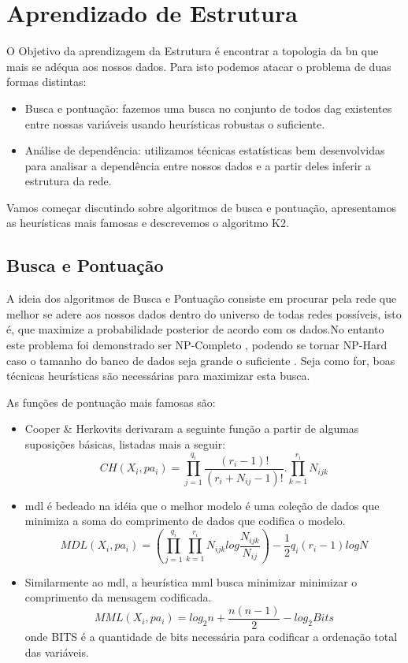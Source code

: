 \section{Aprendizado de Estrutura}
O Objetivo da aprendizagem da Estrutura é encontrar a topologia da \gls{bn} que mais se adéqua aos nossos dados. Para isto podemos atacar o problema de duas formas distintas:

\begin{itemize}
	\item Busca e pontuação: fazemos uma busca no conjunto de todos \gls{dag} existentes entre nossas variáveis usando heurísticas robustas o suficiente.
	\item Análise de dependência: utilizamos técnicas estatísticas bem desenvolvidas para analisar a dependência entre nossos dados e a partir deles inferir a estrutura da rede.
\end{itemize}


Vamos começar discutindo sobre algoritmos de busca e pontuação, apresentamos as heurísticas mais famosas e descrevemos o algoritmo K2.

\subsection{Busca e Pontuação}
A ideia dos algoritmos de Busca e Pontuação consiste em procurar pela rede que melhor se adere aos nossos dados dentro do universo de todas redes possíveis, isto é, que maximize a probabilidade posterior de acordo com os dados.No entanto este problema foi demonstrado ser NP-Completo \cite{chickering96}, podendo se tornar NP-Hard caso o tamanho do banco de dados seja grande o suficiente \cite{chickering04}. Seja como for, boas técnicas heurísticas são necessárias para maximizar esta busca.

As funções de pontuação mais famosas são:
\begin{itemize}
	\item Cooper \& Herkovits \cite{cooper92} derivaram a seguinte função a partir de algumas suposições básicas, listadas mais a seguir:
	\begin{equation}
	CH(X_i, pa_i) = \prod_{j=1}^{q_i}\frac{(r_i - 1)!}{(r_i + N_{ij} - 1)!}.\prod_{k=1}^{r_i}N_{ijk}
	\end{equation}

	\item \gls{mdl} é bedeado na idéia que o melhor modelo é uma coleção de dados que minimiza a soma do comprimento de dados que codifica o modelo.
	\begin{equation}
	MDL(X_i,pa_i) = (\prod_{j=1}^{q_i}\prod_{k=1}^{r_i}N_{ijk}log\frac{N_{ijk}}{N_{ij}})-\frac{1}{2}q_i(r_i-1)logN
	\end{equation}

	\item Similarmente ao \gls{mdl}, a heurística \gls{mml} busca minimizar minimizar o comprimento da mensagem codificada.
	\begin{equation}
	MML(X_i,pa_i) = log_2 n + \frac{n(n-1)}{2}-log_2Bits
	\end{equation}
	onde BITS é a quantidade de bits necessária para codificar a ordenação total das variáveis.
\end{itemize}

